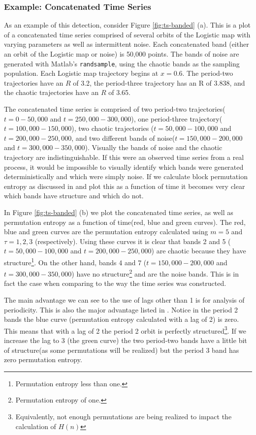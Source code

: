\subsubsection{Example: Concatenated Time Series}\label{sec:concatenate}
As an example of this detection, consider Figure \ref{fig:ts-banded} (a). This is a plot of a concatenated time series comprised of several orbits of the Logistic map with varying parameters as well as intermittent noise. Each concatenated band (either an orbit of the Logistic map or noise) is 50,000 points. The bands of noise are generated with Matlab's \verb|randsample|, using the chaotic bands as the sampling population. Each Logistic map trajectory begins at $x=0.6$. The period-two trajectories have an $R$ of 3.2, the period-three trajectory has an R of 3.838, and the chaotic trajectories have an $R$ of 3.65.

The concatenated time series is comprised of two period-two trajectories($t=0-50,000$ and $t=250,000-300,000$), one period-three trajectory($t=100,000-150,000$), two chaotic trajectories ($t=50,000-100,000$ and $t=200,000-250,000$, and two different bands of noise($t=150,000-200,000$ and $t=300,000-350,000$). Visually the bands of noise and the chaotic trajectory are indistinguishable. If this were an observed time series from a real process, it would be impossible to visually identify which bands were generated deterministically and which were simply noise. If we calculate block permutation entropy as discussed in \cite{cao2004det} and plot this as a function of time it becomes very clear which bands have structure and which do not.

In Figure \ref{fig:ts-banded} (b) we plot the concatenated time series, as well as permutation entropy as a function of time(red, blue and green curves). The red, blue and green curves are the permutation entropy calculated using $m=5$ and $\tau = 1,2,3$ (respectively). Using these curves it is clear that bands 2 and 5 ($t=50,000-100,000$ and $t=200,000-250,000$) are chaotic because they have structure\footnote{Permutation entropy less than one.}. On the other hand, bands 4 and 7 ($t=150,000-200,000$ and $t=300,000-350,000$) have no structure\footnote{Permutation entropy of one.} and are the noise bands. This is in fact the case when comparing to the way the time series was constructed.

The main advantage we can see to the use of lags other than 1 is for analysis of periodicity. This is also the major advantage listed in \cite{cao2004det}. Notice in the period 2 bands the blue curve (permutation entropy calculated with a lag of 2) is zero. This means that with a lag of 2 the period 2 orbit is perfectly structured\footnote{Equivalently, not enough permutations are being realized to impact the calculation of $H(n)$}. If we increase the lag to 3 (the green curve) the two period-two bands have a little bit of structure(as some permutations will be realized) but the period 3 band has zero permutation entropy.

